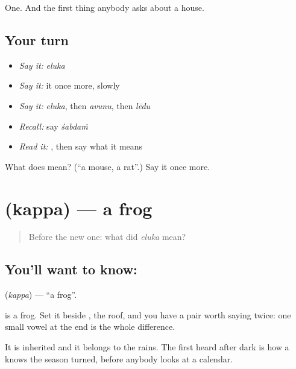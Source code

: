 \begin{grammarlens}[title={What you've built}]
One. And the first thing anybody asks about a house.
\end{grammarlens}

\subsection*{Your turn}
\begin{itemize}
\raggedright
  \item \emph{Say it:} \emph{eluka}
  \item \emph{Say it:} it once more, slowly
  \item \emph{Say it:} \emph{eluka}, then \emph{avunu}, then \emph{lēdu}
  \item \emph{Recall:} say \emph{śabdaṁ}
  \item \emph{Read it:} \textbf{}, then say what it means
\end{itemize}

\begin{tcolorbox}[breakable,colback=teal!4,colframe=teal!35!black,title={Before you move on}]
What does  mean? (\textquotedblleft{}a mouse, a rat\textquotedblright{}.) Say it once more.
\end{tcolorbox}
\section[\texorpdfstring{\te{కప్ప} (kappa)}{కప్ప (kappa)}]{ (kappa) — a frog}

\label{lesson:TE-C70-frog}



\begin{quote}
Before the new one: what did \emph{eluka} mean?
\end{quote}

\subsection*{You'll want to know: }
\textbf{} (\emph{kappa}) — \textquotedblleft{}a frog\textquotedblright{}.

 is a frog. Set it beside , the roof, and you have a pair worth saying twice: one small vowel at the end is the whole difference.

It is inherited and it belongs to the rains. The first  heard after dark is how a  knows the season turned, before anybody looks at a calendar.


